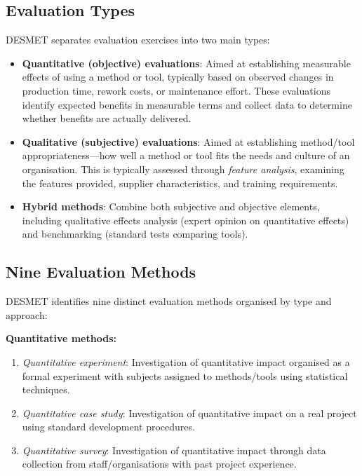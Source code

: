\documentclass[]
{UCD_CS_FYP_Report}
\begin{document}
\subsection{Evaluation Types}

DESMET separates evaluation exercises into two main types:

\begin{itemize}
  \item \textbf{Quantitative (objective) evaluations}: Aimed at establishing measurable effects of using a method or tool, typically based on observed changes in production time, rework costs, or maintenance effort. These evaluations identify expected benefits in measurable terms and collect data to determine whether benefits are actually delivered.
  \item \textbf{Qualitative (subjective) evaluations}: Aimed at establishing method/tool appropriateness---how well a method or tool fits the needs and culture of an organisation. This is typically assessed through \textit{feature analysis}, examining the features provided, supplier characteristics, and training requirements.
  \item \textbf{Hybrid methods}: Combine both subjective and objective elements, including qualitative effects analysis (expert opinion on quantitative effects) and benchmarking (standard tests comparing tools).
\end{itemize}

\subsection{Nine Evaluation Methods}

DESMET identifies nine distinct evaluation methods organised by type and approach:

\textbf{Quantitative methods:}
\begin{enumerate}
  \item \textit{Quantitative experiment}: Investigation of quantitative impact organised as a formal experiment with subjects assigned to methods/tools using statistical techniques.
  \item \textit{Quantitative case study}: Investigation of quantitative impact on a real project using standard development procedures.
  \item \textit{Quantitative survey}: Investigation of quantitative impact through data collection from staff/organisations with past project experience.
\end{enumerate}
\end{document}
